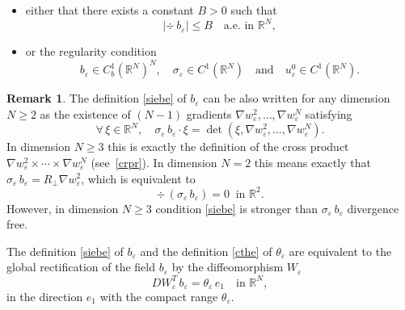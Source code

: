 \documentclass[JEP,XML,SOM,Unicode]{cedram}
\let \si \sigma
\def \RR {\mathbb R}
\theoremstyle{plain}
\theoremstyle{definition}
\newtheorem{Rem}[Thm]{Remark}
\begin{document}
\begin{itemize}
\item either that there exists a constant $B>0$ such that
\begin{equation}\label{beB}
|\div\,b_\varepsilon|\leq B\quad\mbox{a.e. in }\RR^N,
\end{equation}
\item or the regularity condition
\begin{equation}\label{rsiebe}
b_\varepsilon\in C^1_b(\RR^N)^N,\quad \sigma_\varepsilon\in C^1(\RR^N)\quad\mbox{and}\quad u_\varepsilon^0\in C^1(\RR^N).
\end{equation}
\end{itemize}
\begin{Rem}\label{rem.rec}
The definition \eqref{siebe} of $b_\varepsilon$ can be also written for any dimension $N\geq 2$ as the existence of $(N-1)$ gradients $\nabla w_\varepsilon^2,\dots,\nabla w_\varepsilon^N$ satisfying
\begin{equation}\label{siebe2}
\forall\,\xi\in\RR^N,\quad \si_\varepsilon\,b_\varepsilon\cdot\xi=\det\left(\xi,\nabla w_\varepsilon^2,\dots,\nabla w_\varepsilon^N\right).
\end{equation}
In dimension $N\geq 3$ this is exactly the definition of the cross product $\nabla w_\varepsilon^2\times\cdots\times\nabla w_\varepsilon^N$ (see~\eqref{crpr}). In dimension $N=2$ this means exactly that $\si_\varepsilon\,b_\varepsilon=R_\perp\nabla w_\varepsilon^2$, which is equivalent to
\begin{equation}\label{divsiebe}
\div\,(\sigma_\varepsilon\,b_\varepsilon)=0\;\;\mbox{in }\RR^2.
\end{equation}
However, in dimension $N\geq 3$ condition \eqref{siebe} is stronger than $\sigma_\varepsilon\,b_\varepsilon$ divergence free.

The definition \eqref{siebe} of $b_\varepsilon$ and the definition \eqref{cthe} of $\theta_\varepsilon$ are equivalent to the global rectification of the field $b_\varepsilon$ by the diffeomorphism $W_\varepsilon$
\begin{equation}\label{DWebe}
DW_\varepsilon^T\,b_\varepsilon=\theta_\varepsilon\,e_1\quad\mbox{in }\RR^N,
\end{equation}
in the direction $e_1$ with the compact range $\theta_\varepsilon$.
\end{Rem}
\end{document}

